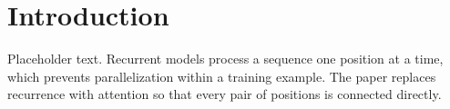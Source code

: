 \section{Introduction}

Placeholder text. Recurrent models process a sequence one position at a time, which prevents parallelization within a training example. The paper replaces recurrence with attention so that every pair of positions is connected directly.
